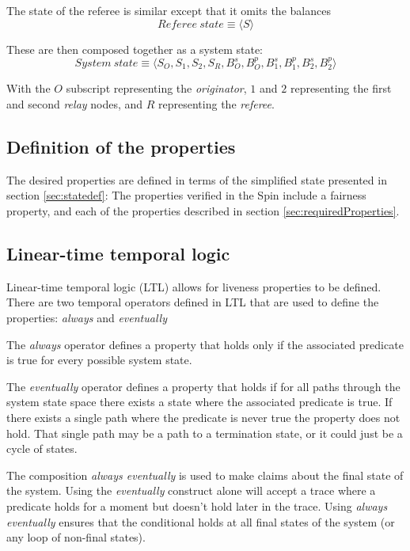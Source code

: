 \documentclass[runningheads]{llncs}
\begin{document}
The state of the referee is similar except that it omits the balances
$$Referee~state \equiv \langle S \rangle$$

These are then composed together as a system state:
$$System~state \equiv \langle S_O, S_1, S_2, S_R, B^s_O, B^p_O, B^s_1, B^p_1, B^s_2, B^p_2  \rangle$$

With the $O$ subscript representing the \emph{originator}, $1$ and $2$ representing the first and second \emph{relay} nodes, and $R$ representing the \emph{referee}.

\subsection{Definition of the properties}
The desired properties are defined in terms of the simplified state presented in section \ref{sec:statedef}: 
The properties verified in the Spin include a fairness property, and each of the properties described in section \ref{sec:requiredProperties}. 

\subsection{Linear-time temporal logic}
Linear-time temporal logic (LTL) allows for liveness properties to be defined. There are two temporal operators defined in LTL that are used to define the properties: \emph{always} and \emph{eventually}

The \emph{always} operator defines a property that holds only if the associated predicate is true for every possible system state.

The \emph{eventually} operator defines a property that holds if for all paths through the system state space there exists a state where the associated predicate is true. If there exists a single path where the predicate is never true the property does not hold. That single path may be a path to a termination state, or it could just be a cycle of states. 

The composition \emph{always eventually} is used to make claims about the final state of the system. Using the \emph{eventually} construct alone will accept a trace where a predicate holds for a moment but doesn't hold later in the trace. Using \emph{always eventually} ensures that the conditional holds at all final states of the system (or any loop of non-final states). 
\end{document}
